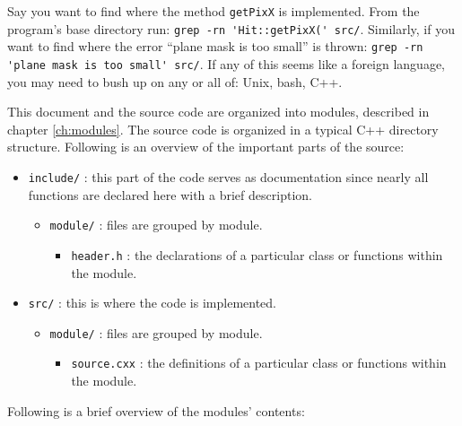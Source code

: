 \documentclass[10pt,a4paper]{book}
\begin{document}
Say you want to find where the method \Verb`getPixX` is implemented. From the program's base directory run: \Verb`grep -rn 'Hit::getPixX(' src/`. Similarly, if you want to find where the error ``plane mask is too small'' is thrown: \Verb`grep -rn 'plane mask is too small' src/`. If any of this seems like a foreign language, you may need to bush up on any or all of: Unix, bash, C++.

This document and the source code are organized into modules, described in chapter \ref{ch:modules}. The source code is organized in a typical C++ directory structure. Following is an overview of the important parts of the source:

\begin{itemize}
	\item \Verb`include/` : this part of the code serves as documentation since nearly all functions are declared here with a brief description.
	\begin{itemize}
		\item \Verb`module/` : files are grouped by module.
		\begin{itemize}
			\item \Verb`header.h` : the declarations of a particular class or functions within the module.
		\end{itemize}
	\end{itemize}
	\item \Verb`src/` : this is where the code is implemented.
	\begin{itemize}
		\item \Verb`module/` : files are grouped by module.
		\begin{itemize}
			\item \Verb`source.cxx` : the definitions of a particular class or functions within the module.
		\end{itemize}
	\end{itemize}
\end{itemize}

Following is a brief overview of the modules' contents:
\end{document}
